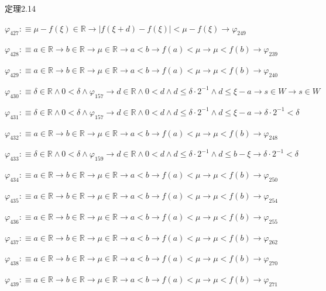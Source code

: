 \begin{fullproof}{定理2.14}
\begin{abbrevlist}
\item $\varphi_{427} :\equiv \mu - f(\xi) \in \mathbb{R} \to \lvert f(\xi + d) - f(\xi) \rvert < \mu - f(\xi) \to \varphi_{249}$
\item $\varphi_{428} :\equiv a \in \mathbb{R} \to b \in \mathbb{R} \to \mu \in \mathbb{R} \to a < b \to f(a) < \mu \to \mu < f(b) \to \varphi_{239}$
\item $\varphi_{429} :\equiv a \in \mathbb{R} \to b \in \mathbb{R} \to \mu \in \mathbb{R} \to a < b \to f(a) < \mu \to \mu < f(b) \to \varphi_{240}$
\item $\varphi_{430} :\equiv \delta \in \mathbb{R} \land 0 < \delta \land \varphi_{157} \to d \in \mathbb{R} \land 0 < d \land d \leq \delta \cdot 2^{-1} \land d \leq \xi - a \to s \in W \to s \in W$
\item $\varphi_{431} :\equiv \delta \in \mathbb{R} \land 0 < \delta \land \varphi_{157} \to d \in \mathbb{R} \land 0 < d \land d \leq \delta \cdot 2^{-1} \land d \leq \xi - a \to \delta \cdot 2^{-1} < \delta$
\item $\varphi_{432} :\equiv a \in \mathbb{R} \to b \in \mathbb{R} \to \mu \in \mathbb{R} \to a < b \to f(a) < \mu \to \mu < f(b) \to \varphi_{248}$
\item $\varphi_{433} :\equiv \delta \in \mathbb{R} \land 0 < \delta \land \varphi_{159} \to d \in \mathbb{R} \land 0 < d \land d \leq \delta \cdot 2^{-1} \land d \leq b - \xi \to \delta \cdot 2^{-1} < \delta$
\item $\varphi_{434} :\equiv a \in \mathbb{R} \to b \in \mathbb{R} \to \mu \in \mathbb{R} \to a < b \to f(a) < \mu \to \mu < f(b) \to \varphi_{250}$
\item $\varphi_{435} :\equiv a \in \mathbb{R} \to b \in \mathbb{R} \to \mu \in \mathbb{R} \to a < b \to f(a) < \mu \to \mu < f(b) \to \varphi_{254}$
\item $\varphi_{436} :\equiv a \in \mathbb{R} \to b \in \mathbb{R} \to \mu \in \mathbb{R} \to a < b \to f(a) < \mu \to \mu < f(b) \to \varphi_{255}$
\item $\varphi_{437} :\equiv a \in \mathbb{R} \to b \in \mathbb{R} \to \mu \in \mathbb{R} \to a < b \to f(a) < \mu \to \mu < f(b) \to \varphi_{262}$
\item $\varphi_{438} :\equiv a \in \mathbb{R} \to b \in \mathbb{R} \to \mu \in \mathbb{R} \to a < b \to f(a) < \mu \to \mu < f(b) \to \varphi_{270}$
\item $\varphi_{439} :\equiv a \in \mathbb{R} \to b \in \mathbb{R} \to \mu \in \mathbb{R} \to a < b \to f(a) < \mu \to \mu < f(b) \to \varphi_{271}$

\end{abbrevlist}
\end{fullproof}
